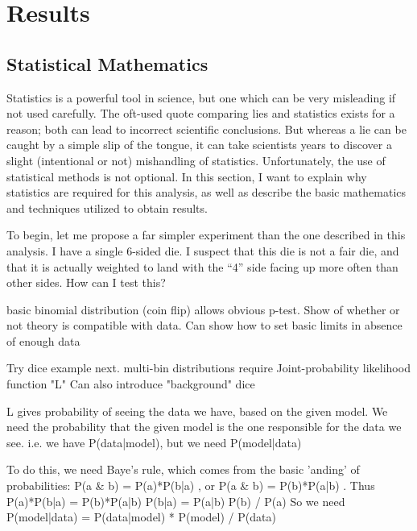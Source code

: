 \chapter{Results} \label{chapter:results}

\section{Statistical Mathematics}

    Statistics is a powerful tool in science,
        but one which can be very misleading if not used carefully.
    The oft-used quote comparing lies and statistics exists for a reason;
        both can lead to incorrect scientific conclusions.
    But whereas a lie can be caught by a simple slip of the tongue,
        it can take scientists years to discover a slight (intentional or not) mishandling of statistics.
    Unfortunately, the use of statistical methods is not optional.
    In this section, I want to explain why statistics are required for this analysis,
        as well as describe the basic mathematics and techniques utilized to obtain results.

    To begin, let me propose a far simpler experiment than the one described in this analysis.
    I have a single 6-sided die.
    I suspect that this die is not a fair die,
        and that it is actually weighted to land with the ``4'' side facing up more often than other sides.
    How can I test this?


    basic binomial distribution (coin flip) allows obvious p-test. 
    Show of whether or not theory is compatible with data.
    Can show how to set basic limits in absence of enough data

    Try dice example next.
    multi-bin distributions require Joint-probability likelihood function "L"
    Can also introduce "background" dice

    L gives probability of seeing the data we have, based on the given model.
    We need the probability that the given model is the one responsible for the data we see.
    i.e. we have P(data|model), but we need P(model|data)

    To do this, we need Baye's rule, which comes from the basic 'anding' of probabilities:
    P(a \& b) = P(a)*P(b|a) , or P(a \& b) = P(b)*P(a|b) . Thus
    P(a)*P(b|a) = P(b)*P(a|b) 
    P(b|a) = P(a|b) P(b) / P(a)
    So we need P(model|data) = P(data|model) * P(model) / P(data)

